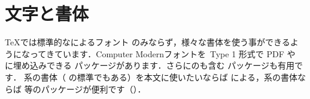 \section{文字と書体}

\TeX では標準的なによるフォント
のみならず，様々な書体を使う事ができるようになってきています．Computer
Modernフォントを\PS\ Type 1 形式で PDF や \PS に埋め込みできる
 パッケージがあります．さらにのも含む  パッケージも有用です．
 系の書体（ の標準でもある）を本文に使いたいならば
による，系の書体ならば
等のパッケージが便利です（）．

